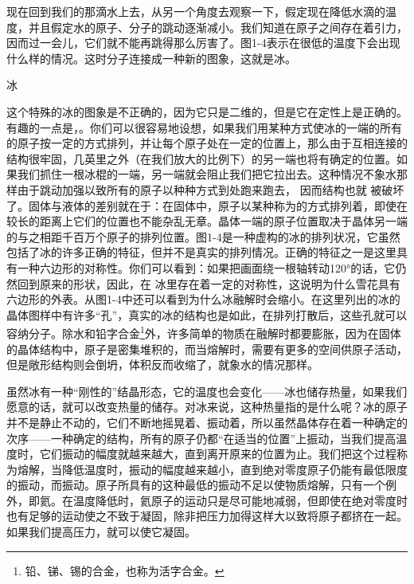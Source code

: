 \documentclass[11pt,oneside]{book}
\begin{document}
\begin{common-format}
现在回到我们的那滴水上去，从另一个角度去观察一下，假定现在降低水滴的温度，并且假定水的原子、分子的跳动逐渐减小。我们知道在原子之间存在着引力，因而过一会儿，它们就不能再跳得那么厉害了。图1-4表示在很低的温度下会出现什么样的情况。这时分子连接成一种新的图象，这就是冰。
\begin{fig}{冰}
\label{fig:冰}
\end{fig}
这个特殊的冰的图象是不正确的，因为它只是二维的，但是它在定性上是正确的。有趣的一点是，。你们可以很容易地设想，如果我们用某种方式使冰的一端的所有的原子按一定的方式排列，并让每个原子处在一定的位置上，那么由于互相连接的结构很牢固，几英里之外（在我们放大的比例下）的另一端也将有确定的位置。如果我们抓住一根冰棍的一端，另一端就会阻止我们把它拉出去。这种情况不象水那样由于跳动加强以致所有的原子以种种方式到处跑来跑去， 因而结构也就
被破坏了。固体与液体的差别就在于：在固体中，原子以某种称为的方式排列着，即使在较长的距离上它们的位置也不能杂乱无章。晶体一端的原子位置取决于晶体另一端的与之相距千百万个原子的排列位置。图1-4是一种虚构的冰的排列状况，它虽然包括了冰的许多正确的特征，但并不是真实的排列情况。正确的特征之一是这里具有一种六边形的对称性。你们可以看到：如果把画面绕一根轴转动120°的话，它仍然回到原来的形状，因此，在
冰里存在着一定的对称性，这说明为什么雪花具有六边形的外表。从图1-4中还可以看到为什么冰融解时会缩小。在这里列出的冰的晶体图样中有许多“孔”，真实的冰的结构也是如此，在排列打散后，这些孔就可以容纳分子。除水和铅字合金\footnote{铅、锑、锡的合金，也称为活字合金。}外，许多简单的物质在融解时都要膨胀，因为在固体的晶体结构中，原子是密集堆积的，而当熔解时，需要有更多的空间供原子活动，但是敞形结构则会倒坍，体积反而收缩了，就象水的情况那样。

虽然冰有一种“刚性的”结晶形态，它的温度也会变化——冰也储存热量，如果我们愿意的话，就可以改变热量的储存。对冰来说，这种热量指的是什么呢？冰的原子并不是静止不动的，它们不断地摇晃着、振动着，所以虽然晶体存在着一种确定的次序——一种确定的结构，所有的原子仍都“在适当的位置”上振动，当我们提高温度时，它们振动的幅度就越来越大，直到离开原来的位置为止。我们把这个过程称为熔解，当降低温度时，振动的幅度越来越小，直到绝对零度原子仍能有最低限度的振动，而振动。原子所具有的这种最低的振动不足以使物质熔解，只有一个例外，即氦。在温度降低时，氦原子的运动只是尽可能地减弱，但即使在绝对零度时也有足够的运动使之不致于凝固，除非把压力加得这样大以致将原子都挤在一起。如果我们提高压力，就可以使它凝固。



\end{common-format}
\end{document}
